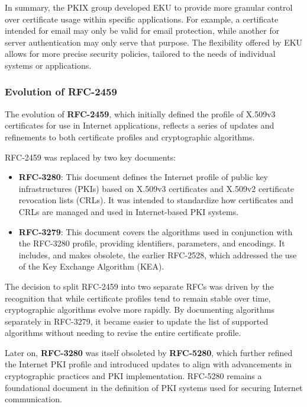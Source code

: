 In summary, the PKIX group developed EKU to provide more granular 
control over certificate usage within specific applications. For 
example, a certificate intended for email may only be valid for email 
protection, while another for server authentication may only serve 
that purpose. The flexibility offered by EKU allows for more precise 
security policies, tailored to the needs of individual systems or 
applications.

\subsubsection{Evolution of RFC-2459}

The evolution of \textbf{RFC-2459}, which initially defined the 
profile of X.509v3 certificates for use in Internet applications, 
reflects a series of updates and refinements to both certificate 
profiles and cryptographic algorithms.

RFC-2459 was replaced by two key documents:
\begin{itemize}
    \item \textbf{RFC-3280}: This document defines the Internet 
    profile of public key infrastructures (PKIs) based on X.509v3 
    certificates and X.509v2 certificate revocation lists (CRLs). 
    It was intended to standardize how certificates and CRLs are 
    managed and used in Internet-based PKI systems.
    \item \textbf{RFC-3279}: This document covers the algorithms 
    used in conjunction with the RFC-3280 profile, providing 
    identifiers, parameters, and encodings. It includes, and makes 
    obsolete, the earlier RFC-2528, which addressed the use of 
    the Key Exchange Algorithm (KEA).
\end{itemize}

The decision to split RFC-2459 into two separate RFCs was driven by 
the recognition that while certificate profiles tend to remain stable 
over time, cryptographic algorithms evolve more rapidly. By 
documenting algorithms separately in RFC-3279, it became easier to 
update the list of supported algorithms without needing to revise the 
entire certificate profile.

Later on, \textbf{RFC-3280} was itself obsoleted by \textbf{RFC-5280}, 
which further refined the Internet PKI profile and introduced updates 
to align with advancements in cryptographic practices and PKI 
implementation. RFC-5280 remains a foundational document in the 
definition of PKI systems used for securing Internet communication.
